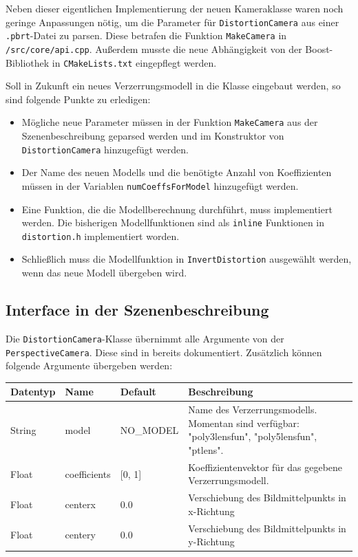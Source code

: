Neben dieser eigentlichen Implementierung der neuen Kameraklasse waren noch geringe Anpassungen nötig, um die Parameter für \texttt{DistortionCamera} aus einer \texttt{.pbrt}-Datei zu parsen. Diese betrafen die Funktion \texttt{MakeCamera} in \texttt{/src/core/api.cpp}. Außerdem musste die neue Abhängigkeit von der Boost-Bibliothek in \texttt{CMakeLists.txt} eingepflegt werden.

Soll in Zukunft ein neues Verzerrungsmodell in die Klasse eingebaut werden, so sind folgende Punkte zu erledigen:
\begin{itemize}
	\item Mögliche neue Parameter müssen in der Funktion \texttt{MakeCamera} aus der Szenenbeschreibung geparsed werden und im Konstruktor von \texttt{DistortionCamera} hinzugefügt werden.
	\item Der Name des neuen Modells und die benötigte Anzahl von Koeffizienten müssen in der Variablen \texttt{numCoeffsForModel} hinzugefügt werden.
	\item Eine Funktion, die die Modellberechnung durchführt, muss implementiert werden. Die bisherigen Modellfunktionen sind als \texttt{inline} Funktionen in \texttt{distortion.h} implementiert worden.
	\item Schließlich muss die Modellfunktion in \texttt{InvertDistortion} ausgewählt werden, wenn das neue Modell übergeben wird.
\end{itemize}

\subsection{Interface in der Szenenbeschreibung}

Die \texttt{DistortionCamera}-Klasse übernimmt alle Argumente von der \texttt{PerspectiveCamera}. Diese sind in \cite{pbrt_file} bereits dokumentiert. Zusätzlich können folgende Argumente übergeben werden:
\begin{table}[h]
	\begin{tabularx}{\textwidth}{l|l|l|X}
		\textbf{Datentyp} & \textbf{Name} & \textbf{Default} & \textbf{Beschreibung} \\ \hline \hline
		String & model & NO\_MODEL & Name des Verzerrungsmodells. Momentan sind verfügbar: "poly3lensfun", \mbox{"poly5lensfun"}, "ptlens".\\
		Float & coefficients & [0, 1] & Koeffizientenvektor für das gegebene Verzerrungsmodell. \\
		Float & centerx & 0.0 & Verschiebung des Bildmittelpunkts in \mbox{x-Richtung} \\
		Float & centery & 0.0 & Verschiebung des Bildmittelpunkts in \mbox{y-Richtung}
	\end{tabularx}
\end{table}